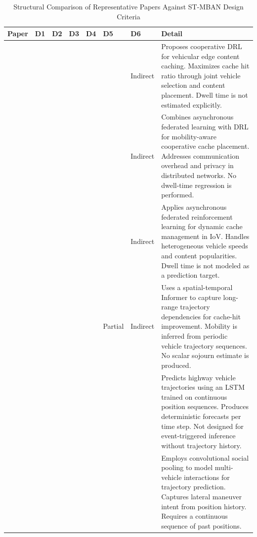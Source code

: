 \documentclass[journal]{IEEEtran}
\begin{document}
\begin{table}[!t]
\centering
\caption{Structural Comparison of Representative Papers Against ST-MBAN Design Criteria}
\label{tab:comparison}
\begin{tabular}{|C{1.5cm}|C{1.3cm}|C{1.3cm}|C{1.3cm}|C{1.4cm}|C{1.3cm}|C{1.3cm}|L{5.2cm}|}
\hline
\textbf{Paper} &
\textbf{D1} &
\textbf{D2} &
\textbf{D3} &
\textbf{D4} &
\textbf{D5} &
\textbf{D6} &
\textbf{Detail} \\
\hline\hline
\cite{Wang2020IoT} &  &  &  &  &  & Indirect &
{\small Proposes cooperative DRL for vehicular edge content caching. Maximizes cache hit ratio through joint vehicle selection and content placement. Dwell time is not estimated explicitly.} \\
\hline
\cite{Wang2023Async} &  &  &  &  &  & Indirect &
{\small Combines asynchronous federated learning with DRL for mobility-aware cooperative cache placement. Addresses communication overhead and privacy in distributed networks. No dwell-time regression is performed.} \\
\hline
\cite{Jiang2024} &  &  &  &  &  & Indirect &
{\small Applies asynchronous federated reinforcement learning for dynamic cache management in IoV. Handles heterogeneous vehicle speeds and content popularities. Dwell time is not modeled as a prediction target.} \\
\hline
\cite{Wang2025Informer} &  &  &  &  & Partial & Indirect &
{\small Uses a spatial-temporal Informer to capture long-range trajectory dependencies for cache-hit improvement. Mobility is inferred from periodic vehicle trajectory sequences. No scalar sojourn estimate is produced.} \\
\hline
\cite{Altche2017} &  &  &  &  &  &  &
{\small Predicts highway vehicle trajectories using an LSTM trained on continuous position sequences. Produces deterministic forecasts per time step. Not designed for event-triggered inference without trajectory history.} \\
\hline
\cite{Deo2018} &  &  &  &  &  &  &
{\small Employs convolutional social pooling to model multi-vehicle interactions for trajectory prediction. Captures lateral maneuver intent from position history. Requires a continuous sequence of past positions.} \\

\end{tabular}
\end{table}
\end{document}

